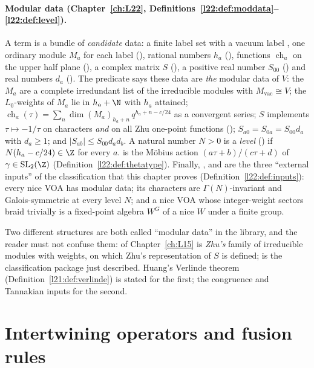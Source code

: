 \paragraph{Modular data (Chapter~\ref{ch:L22}, Definitions~\ref{l22:def:moddata}--\ref{l22:def:level}).}
A term  is a bundle of \emph{candidate} data: a finite label set
 with a vacuum label , one ordinary module $M_a$ for each label (), rational numbers
$h_a$ (), functions $\operatorname{ch}_a$ on the upper half plane (), a complex matrix $S$
(), a positive real number $S_{00}$ () and real numbers $d_a$ (). The predicate
 says these data are \emph{the} modular data of $V$: the $M_a$ are a complete irredundant list of
the irreducible modules with $M_{\mathrm{vac}}\cong V$; the $L_0$-weights of $M_a$ lie in $h_a+\N$ with $h_a$ attained;
$\operatorname{ch}_a(\tau)=\sum_n\dim(M_a)_{h_a+n}\,q^{h_a+n-c/24}$ as a convergent series; $S$ implements
$\tau\mapsto-1/\tau$ on characters \emph{and} on all Zhu one-point functions (); $S_{a0}=S_{0a}=S_{00}d_a$
with $d_a\ge1$; and $|S_{ab}|\le S_{00}d_ad_b$. A natural number $N>0$ is a \emph{level} () if
$N(h_a-c/24)\in\Z$ for every $a$.  is the Möbius action $(a\tau+b)/(c\tau+d)$ of
$\gamma\in\mathrm{SL}_2(\Z)$ (Definition~\ref{l22:def:thetatype}). Finally, , 
and  are the three ``external inputs'' of the classification that this chapter proves
(Definition~\ref{l22:def:inputs}): every nice VOA has modular data; its characters are $\Gamma(N)$-invariant and
Galois-symmetric at every level $N$; and a nice VOA whose integer-weight sectors braid trivially is a fixed-point
algebra $W^G$ of a nice $W$ under a finite group.

Two different structures are both called ``modular data'' in the library, and the reader must not confuse them:
 of Chapter~\ref{ch:L15} is \emph{Zhu's} family of irreducible modules with weights, on
which Zhu's representation  of $S$ is defined;  is the
classification package just described. Huang's Verlinde theorem (Definition~\ref{l21:def:verlinde}) is stated for the
first; the congruence and Tannakian inputs for the second.

\section{Intertwining operators and fusion rules}\label{l21:sec:intertwining}

